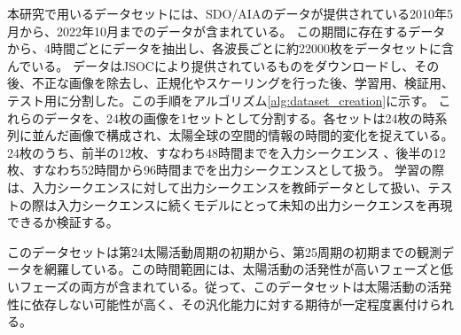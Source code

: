 本研究で用いるデータセットには、SDO/AIAのデータが提供されている2010年5月から、2022年10月までのデータが含まれている。  
この期間に存在するデータから、4時間ごとにデータを抽出し、各波長ごとに約22000枚をデータセットに含んでいる。
データはJSOCにより提供されているものをダウンロードし、その後、不正な画像を除去し、正規化やスケーリングを行った後、学習用、検証用、テスト用に分割した。この手順をアルゴリズム\ref{alg:dataset_creation}に示す。
これらのデータを、24枚の画像を1セットとして分割する。各セットは24枚の時系列に並んだ画像で構成され、太陽全球の空間的情報の時間的変化を捉えている。24枚のうち、前半の12枚、すなわち48時間までを入力シークエンス 、後半の12枚、すなわち52時間から96時間までを出力シークエンスとして扱う。
学習の際は、入力シークエンスに対して出力シークエンスを教師データとして扱い、テストの際は入力シークエンスに続くモデルにとって未知の出力シークエンスを再現できるか検証する。

このデータセットは第24太陽活動周期の初期から、第25周期の初期までの観測データを網羅している。この時間範囲には、太陽活動の活発性が高いフェーズと低いフェーズの両方が含まれている。従って、このデータセットは太陽活動の活発性に依存しない可能性が高く、その汎化能力に対する期待が一定程度裏付けられる。

